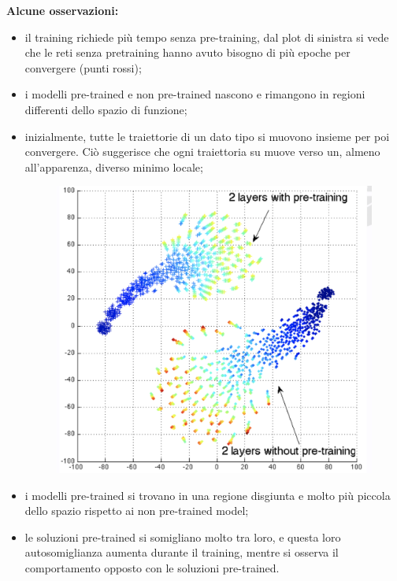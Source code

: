\textbf{Alcune osservazioni:}
\begin{itemize}
  \item il training richiede più tempo senza pre-training, dal plot di sinistra si vede che le reti senza 
  pretraining hanno avuto bisogno di più epoche per convergere (punti rossi);
  \item i modelli pre-trained e non pre-trained nascono e rimangono in regioni differenti dello spazio di 
  funzione;
  \item inizialmente, tutte le traiettorie di un dato tipo si muovono insieme per poi convergere. Ciò 
  suggerisce che ogni traiettoria su muove verso un, almeno all'apparenza, diverso minimo locale;
  \begin{figure}[!h]
    \includegraphics[scale=.35]{images/representation_learning/obs01.png}
    \centering
  \end{figure}
  \item i modelli pre-trained si trovano in una regione disgiunta e molto più piccola dello spazio rispetto
  ai non pre-trained model;
  \item le soluzioni pre-trained si somigliano molto tra loro, e questa loro autosomiglianza aumenta durante
  il training, mentre si osserva il comportamento opposto con le soluzioni pre-trained.
  \begin{figure}[!h]

\end{figure}
\end{itemize}

